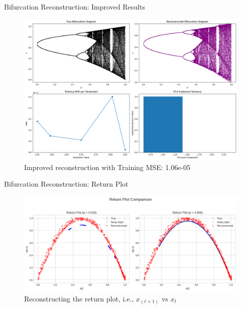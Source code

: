 \documentclass{beamer}
\begin{document}
\begin{frame}{Bifurcation Reconstruction: Improved Results}
\begin{figure}
\centering
\includegraphics[width=1\linewidth]{figures/bd_1_results.png}
\caption{Improved reconstruction with Training MSE: 1.06e-05}
\end{figure}
\end{frame}

\begin{frame}{Bifurcation Reconstruction: Return Plot}
\begin{figure}
\centering
\includegraphics[width=1\linewidth]{figures/bd_return_plot_2.png}
\caption{Reconstructing the return plot, i.e., $x_{(t+1)}$ vs $x_t$}
\end{figure}
\end{frame}
\end{document}

